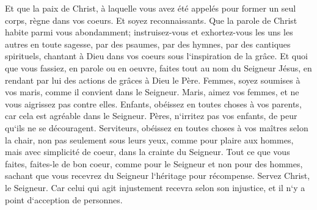 \verse Et que la paix de Christ, à laquelle vous avez été appelés pour former un seul corps, règne dans vos coeurs. Et soyez reconnaissants. 
\verse Que la parole de Christ habite parmi vous abondamment; instruisez-vous et exhortez-vous les uns les autres en toute sagesse, par des psaumes, par des hymnes, par des cantiques spirituels, chantant à Dieu dans vos coeurs sous l`inspiration de la grâce. 
\verse Et quoi que vous fassiez, en parole ou en oeuvre, faites tout au nom du Seigneur Jésus, en rendant par lui des actions de grâces à Dieu le Père. 
\verse Femmes, soyez soumises à vos maris, comme il convient dans le Seigneur. 
\verse Maris, aimez vos femmes, et ne vous aigrissez pas contre elles. 
\verse Enfants, obéissez en toutes choses à vos parents, car cela est agréable dans le Seigneur. 
\verse Pères, n`irritez pas vos enfants, de peur qu`ils ne se découragent. 
\verse Serviteurs, obéissez en toutes choses à vos maîtres selon la chair, non pas seulement sous leurs yeux, comme pour plaire aux hommes, mais avec simplicité de coeur, dans la crainte du Seigneur. 
\verse Tout ce que vous faites, faites-le de bon coeur, comme pour le Seigneur et non pour des hommes, 
\verse sachant que vous recevrez du Seigneur l`héritage pour récompense. Servez Christ, le Seigneur. 
\verse Car celui qui agit injustement recevra selon son injustice, et il n`y a point d`acception de personnes. 


